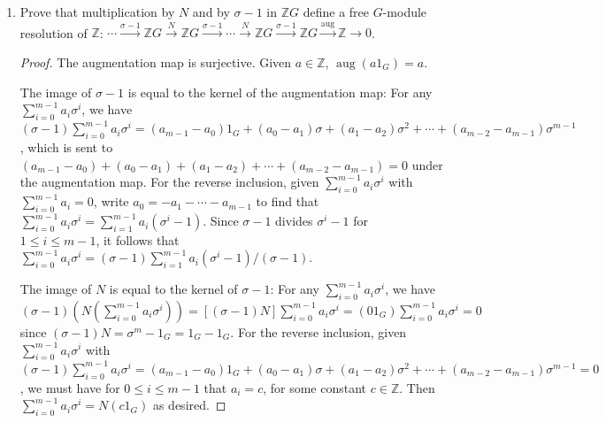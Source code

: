 \documentclass[11pt]{article}
\newcommand{\br}[1]{\left(#1\right)}
\newcommand{\sbr}[1]{\left[#1\right]}
\DeclareMathOperator{\aug}{aug}
\begin{document}
\begin{enumerate}
\begin{enumerate}
\begin{proof}
            This map respects the action of $\mathbb{Z}G$: In $\mathbb{Z}G$ we have $(\sum_{i=0}^{m-1}a_i\sigma^i)(\sum_{j=0}^{m-1}b_j\sigma^j) = \sum_{0\leq i,j\leq m-1}(a_ib_j)\sigma^{i+j}$ and in $\mathbb{Z}$ we have $(\sum_{i=0}^{m-1}a_i\sigma^i)(\sum_{j=0}^{m-1}b_j) = \sum_{0\leq i,j\leq m-1}a_i\sigma^ib_j = \sum_{0\leq i,j\leq m-1}a_ib_j$. By additivity we have \begin{align*}
                \aug\sbr{\br{\sum_{i=0}^{m-1}a_i\sigma^i}\br{\sum_{j=0}^{m-1}b_j\sigma^j}} &= \sum_{0\leq i,j\leq m-1}a_ib_j \\
                &= \br{\sum_{i=0}^{m-1}a_i\sigma^i}\br{\sum_{j=0}^{m-1}b_j} \\
                &= \br{\sum_{i=0}^{m-1}a_i\sigma^i}\aug\br{\sum_{j=0}^{m-1}b_j\sigma^j}
            \end{align*} from which it follows that $\aug\colon \mathbb{Z}G\to \mathbb{Z}$ is a $\mathbb{Z}G$-module homomorphism.
        \end{proof}
        \item Prove that multiplication by $N$ and by $\sigma-1$ in $\mathbb{Z}G$ define a free $G$-module resolution of $\mathbb{Z}$: $\cdots\xrightarrow{\sigma-1}\mathbb{Z}G\xrightarrow{N}\mathbb{Z}G\xrightarrow{\sigma-1}\cdots\xrightarrow{N}\mathbb{Z}G\xrightarrow{\sigma-1}\mathbb{Z}G\xrightarrow{\aug}\mathbb{Z}\to 0$. \begin{proof}
            The augmentation map is surjective. Given $a\in\mathbb{Z}$, $\aug(a1_G) = a$. 
            
            The image of $\sigma-1$ is equal to the kernel of the augmentation map: For any $\sum_{i=0}^{m-1}a_i\sigma^i$, we have $(\sigma-1)\sum_{i=0}^{m-1}a_i\sigma^i = (a_{m-1}-a_0)1_G + (a_0-a_1)\sigma + (a_1-a_2)\sigma^2 + \cdots + (a_{m-2}-a_{m-1})\sigma^{m-1}$, which is sent to $(a_{m-1}-a_0) + (a_0-a_1) + (a_1-a_2) + \cdots + (a_{m-2}-a_{m-1}) =0$ under the augmentation map. For the reverse inclusion, given $\sum_{i=0}^{m-1}a_i\sigma^i$ with $\sum_{i=0}^{m-1}a_i = 0$, write $a_0 = -a_1 - \cdots - a_{m-1}$ to find that $\sum_{i=0}^{m-1}a_i\sigma^i = \sum_{i=1}^{m-1}a_i(\sigma^i-1).$ Since $\sigma-1$ divides $\sigma^i-1$ for $1\leq i\leq m-1$, it follows that $\sum_{i=0}^{m-1}a_i\sigma^i = (\sigma-1)\sum_{i=1}^{m-1}a_i(\sigma^i-1)/(\sigma-1).$

            The image of $N$ is equal to the kernel of $\sigma-1$: For any $\sum_{i=0}^{m-1}a_i\sigma^i$, we have $(\sigma-1)(N(\sum_{i=0}^{m-1}a_i\sigma^i)) = [(\sigma-1)N]\sum_{i=0}^{m-1}a_i\sigma^i = (01_G)\sum_{i=0}^{m-1}a_i\sigma^i = 0$ since $(\sigma-1)N = \sigma^m-1_G = 1_G - 1_G$. For the reverse inclusion, given $\sum_{i=0}^{m-1}a_i\sigma^i$ with $(\sigma-1)\sum_{i=0}^{m-1}a_i\sigma^i = (a_{m-1}-a_0)1_G + (a_0-a_1)\sigma + (a_1-a_2)\sigma^2 + \cdots + (a_{m-2}-a_{m-1})\sigma^{m-1} = 0$, we must have for $0\leq i\leq m-1$ that $a_i = c$, for some constant $c\in\mathbb{Z}$. Then $\sum_{i=0}^{m-1}a_i\sigma^i = N(c1_G)$ as desired.


\end{proof}
\end{enumerate}
\end{enumerate}
\end{document}
